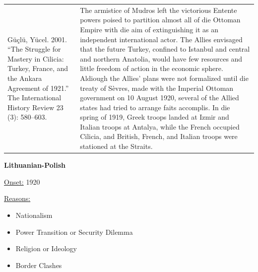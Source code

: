{\begin{longtable}{p{}p{}}
\\
Güçlü, Yücel. 2001. “The Struggle for Mastery in Cilicia: Turkey, France, and the Ankara Agreement of 1921.” The International History Review 23 (3): 580–603.
 & The armistice of Mudros left the victorious Entente powers poised to partition almost all of die Ottoman Empire with die aim of extinguishing it as an independent international actor. The Allies envisaged that the future Turkey, confined to Istanbul and central and northern Anatolia, would have few resources and little freedom of action in the economic sphere. Aldiough the Allies' plans were not formalized until die treaty of Sèvres, made with the Imperial Ottoman government on 10 August 1920, several of the Allied states had tried to arrange faits accomplis. In die spring of 1919, Greek troops landed at Izmir and Italian troops at Antalya, while the French occupied Cilicia, and British, French, and Italian troops were stationed at the Straits.
\\
\end{longtable}}
\clearpage
         \textbf{Lithuanian-Polish} 

          \underline{Onset:} 1920         

\underline{Reasons:}
\begin{itemize}
\item Nationalism
\item Power Transition or Security Dilemma
\item Religion or Ideology
\item Border Clashes
\end{itemize}

